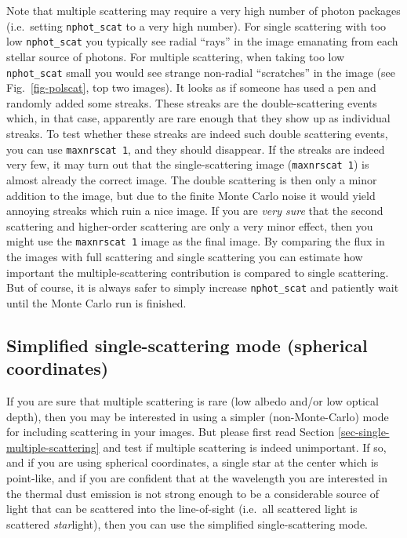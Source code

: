 \documentclass{report}
\begin{document}
Note that multiple scattering may require a very high number of photon
packages (i.e.~setting {\small\tt nphot\_scat} to a very high number). For
single scattering with too low {\small\tt nphot\_scat} you typically see
radial ``rays'' in the image emanating from each stellar source of
photons. For multiple scattering, when taking too low {\small\tt
  nphot\_scat} small you would see strange non-radial ``scratches'' in the
image (see Fig.~\ref{fig-polscat}, top two images). It looks as if someone
has used a pen and randomly added some streaks. These streaks are the
double-scattering events which, in that case, apparently are rare enough
that they show up as individual streaks. To test whether these streaks are
indeed such double scattering events, you can use {\small\tt maxnrscat 1},
and they should disappear. If the streaks are indeed very few, it may turn
out that the single-scattering image ({\small\tt maxnrscat 1}) is almost
already the correct image. The double scattering is then only a minor
addition to the image, but due to the finite Monte Carlo noise it would
yield annoying streaks which ruin a nice image. If you are {\em very sure}
that the second scattering and higher-order scattering are only a very minor
effect, then you might use the {\small\tt maxnrscat 1} image as the final
image. By comparing the flux in the images with full scattering and single
scattering you can estimate how important the multiple-scattering
contribution is compared to single scattering. But of course, it is always
safer to simply increase {\small\tt nphot\_scat} and patiently wait until
the Monte Carlo run is finished.

\subsection{Simplified single-scattering mode (spherical coordinates)}
\label{sec-simple-single-scattering}
%
If you are sure that multiple scattering is rare (low albedo and/or low optical
depth), then you may be interested in using a simpler (non-Monte-Carlo) mode for
including scattering in your images.  But please first read Section
\ref{sec-single-multiple-scattering} and test if multiple scattering is indeed
unimportant. If so, and if you are using spherical coordinates, a single star at
the center which is point-like, and if you are confident that at the wavelength
you are interested in the thermal dust emission is not strong enough to be a
considerable source of light that can be scattered into the line-of-sight
(i.e.~all scattered light is scattered {\em star}light), then you can use the
simplified single-scattering mode.
\end{document}

